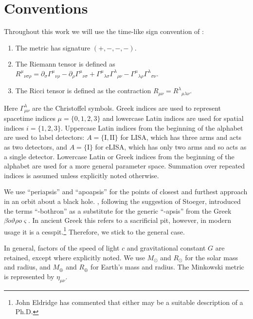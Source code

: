 \chapter{Conventions}
\label{conventions}

Throughout this work we will use the time-like sign convention of \citet{Landau1975}:
\begin{enumerate}
\item The metric has signature $(+,-,-,-)$.
\item The Riemann tensor is defined as ${R^\mu}_{\nu\sigma\rho} = \partial_\sigma {\Gamma^\mu}_{\nu\rho} - \partial_\rho {\Gamma^\mu}_{\nu\sigma} + {\Gamma^\mu}_{\lambda\sigma}{\Gamma^\lambda}_{\rho\nu} - {\Gamma^\mu}_{\lambda\rho}{\Gamma^\lambda}_{\sigma\nu}$.
\item The Ricci tensor is defined as the contraction $R_{\mu\nu} = {R^\lambda}_{\mu\lambda\nu}$.
\end{enumerate}
Here $\Gamma^\lambda_{\mu\nu}$ are the Christoffel symbols. Greek indices are used to represent spacetime indices $\mu = \{0,1,2,3\}$ %
and lowercase Latin indices are used for spatial indices $i = \{1,2,3\}$. Uppercase Latin indices from the beginning of the alphabet are used to label detectors: $A = \{\mathrm{I}, \mathrm{II}\}$ for LISA, which has three arms and acts as two detectors, and $A = \{\mathrm{I}\}$ for eLISA, which has only two arms and so acts as a single detector. Lowercase Latin or Greek indices from the beginning of the alphabet are used for a more general parameter space. Summation over repeated indices is assumed unless explicitly noted otherwise.

We use ``periapsis'' and ``apoapsis'' for the points of closest and furthest approach in an orbit about a black hole. \citet{Frank1976}, following the suggestion of Stoeger, introduced the terms ``-bothron'' as a substitute for the generic ``-apsis'' from the Greek {$\mathit{\beta\acute{o}\vartheta\rho o \varsigma}$}. In ancient Greek this refers to a sacrificial pit, however, in modern usage it is a cesspit.\footnote{John Eldridge has commented that either may be a suitable description of a Ph.D.} Therefore, we stick to the general case.

In general, factors of the speed of light $c$ and gravitational constant $G$ are retained, except where explicitly noted. We use $M_\odot$ and $R_\odot$ for the solar mass and radius, and $M_\oplus$ and $R_\oplus$ for Earth's mass and radius. The Minkowski metric is represented by $\eta_{\mu\nu}$.

